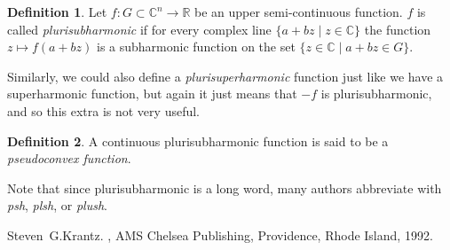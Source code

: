 \documentclass[12pt]{article}
\theoremstyle{theorem}
\theoremstyle{definition}
\newtheorem*{defn}{Definition}
\begin{document}
\begin{defn}
Let $f \colon G \subset {\mathbb{C}}^n \to {\mathbb{R}}$ be an upper semi-continuous function.   $f$ is called {\em plurisubharmonic}
if for every complex line $\{ a + b z \mid z \in {\mathbb{C}} \}$
the function $z \mapsto f(a + bz)$ is a subharmonic function on the set
$\{ z \in {\mathbb{C}} \mid a + b z \in G \}$.
\end{defn}

Similarly, we could also define a {\em plurisuperharmonic} function just like
we have a superharmonic function, but again it just means that $-f$ is
plurisubharmonic, and so this extra  is not very useful.

\begin{defn}
A continuous plurisubharmonic function is said to be a {\em pseudoconvex function}.
\end{defn}

Note that since plurisubharmonic is a long word, many authors abbreviate
with {\em psh}, {\em plsh}, or {\em plush}.

\begin{thebibliography}{9}
Steven~G.\@ Krantz.
{\em {}},
AMS Chelsea Publishing, Providence, Rhode Island, 1992.
\end{thebibliography}
\end{document}
